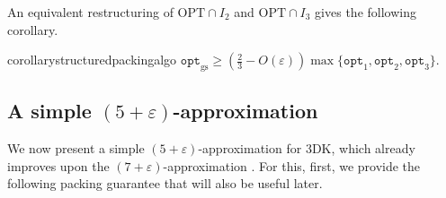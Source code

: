 \documentclass[10pt,a4paper]{amsart}
\newcommand{\eps}{\varepsilon}
\renewcommand{\epsilon}{\varepsilon} %
\newcommand{\tdk}{\textsc{3DK}}
\theoremstyle{definition}
\newcommand{\opt}{\mathtt{opt}}
\newcommand{\optgs}{\mathtt{opt}_{\mathrm{gs}}}
\begin{document}
An equivalent restructuring of $\text{OPT}\cap I_2$ and $\text{OPT}\cap I_3$ gives the following corollary.

\begin{restatable}{corollary}{structuredpackingalgo}
\label{thm:structuredpackingalgo}
    $\optgs \ge \left(\frac{2}{3}-O(\epsilon)\right) \max\{\opt_1, \opt_2, \opt_3\}$.
\end{restatable}















\subsection{A simple \texorpdfstring{$(5+\eps)$}{5+ε}-approximation}
\label{sec:5approx}
We now present a simple $(5+\epsilon)$-approximation for \tdk, which already improves upon the $(7+\epsilon)$-approximation \cite{3d-knapsack}. For this, first, we provide the following packing guarantee that will also be useful later.
\end{document}
